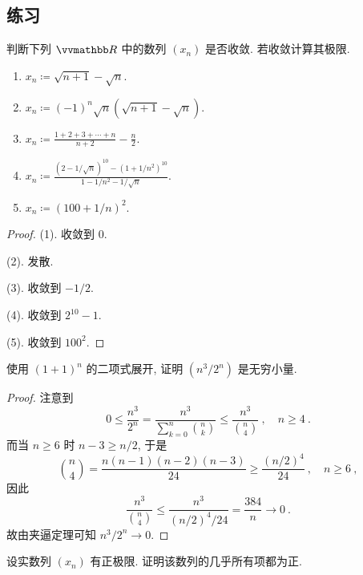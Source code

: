 \subsection{练习}

\begin{exercise}
    判断下列 \(\R\) 中的数列 \((x_n)\) 是否收敛. 若收敛计算其极限.
    \begin{enumerate}
        \item \(x_n \coloneqq \sqrt{n + 1} - \sqrt{n}\).
        \item \(x_n \coloneqq (- 1)^n \sqrt{n} (\sqrt{n + 1} - \sqrt{n})\).
        \item \(\displaystyle x_n \coloneqq \frac{1 + 2 + 3 + \cdots + n}{n + 2} - \frac{n}{2}\).
        \item \(\displaystyle x_n \coloneqq \frac{(2 - 1 / \sqrt{n})^{10} - (1 + 1 / n^2)^{10}}{1 - 1 / n^2 - 1 / \sqrt{n}}\).
        \item \(x_n \coloneqq (100 + 1 / n)^2\).
    \end{enumerate}
\end{exercise}

\begin{proof}
    (1). 收敛到 \(0\).

    (2). 发散.

    (3). 收敛到 \(- 1 / 2\).

    (4). 收敛到 \(2^{10} - 1\).

    (5). 收敛到 \(100^2\).
\end{proof}

\begin{exercise}
    使用 \((1 + 1)^n\) 的二项式展开, 证明 \((n^3 / 2^n)\) 是无穷小量.
\end{exercise}

\begin{proof}
    注意到
    \[
        0 \leq \frac{n^3}{2^n} = \frac{n^3}{\sum_{k = 0}^n \binom{n}{k}} \leq \frac{n^3}{\binom{n}{4}}\ ,\quad n \geq 4\ .
    \]
    而当 \(n \geq 6\) 时 \(n - 3 \geq n / 2\), 于是
    \[
        \binom{n}{4} = \frac{n (n - 1) (n - 2) (n - 3)}{24} \geq \frac{(n / 2)^4}{24}\ ,\quad n \geq 6\ ,
    \]
    因此
    \[
        \frac{n^3}{\binom{n}{4}} \leq \frac{n^3}{(n / 2)^4 \big/ 24} = \frac{384}{n} \to 0\ .
    \]
    故由夹逼定理可知 \(n^3 / 2^n \to 0\).
\end{proof}

\begin{exercise}[保号性]\label{ex:limits-preserve-sign}
    设实数列 \((x_n)\) 有正极限. 证明该数列的几乎所有项都为正.
\end{exercise}

